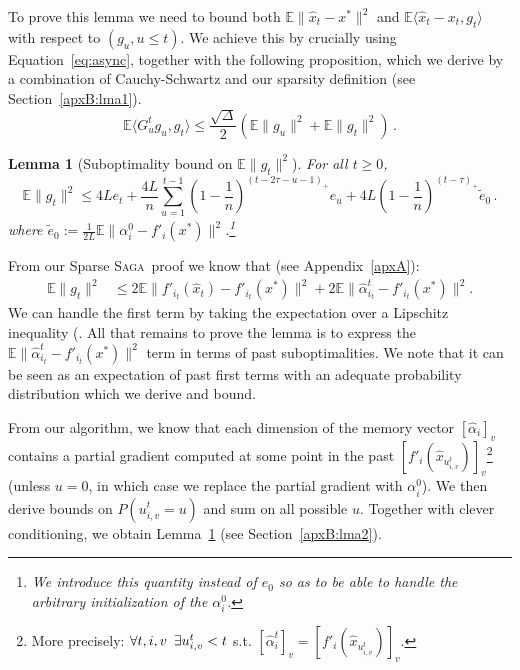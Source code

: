 \documentclass[twoside]{article}
\newcommand{\overlap}{\tau}
\newcommand{\sparsity}{\Delta}
\newcommand{\lipschitz}{L}
\newcommand{\E}{\mathbb{E}}
\newcommand{\SAGA}{\textsc{Saga}}
\newtheorem{lemma}{Lemma}
\begin{document}
To prove this lemma we need to bound both $\E\|\hat x_t - x^*\|^2$ and $\E\langle \hat x_t -x_t,  g_t\rangle$ with respect to $(g_u, u\leq t)$. 
We achieve this by crucially using Equation~\eqref{eq:async}, together with the following proposition, which we derive by a combination of Cauchy-Schwartz and our sparsity definition (see Section~\ref{apxB:lma1}).
\begin{equation}
\E \langle G_{u}^t g_{u}, g_t \rangle \leq \frac{\sqrt{\sparsity}}{2}(\E\|g_{u}\|^2 + \E\|g_{t}\|^2)  \, .
\end{equation}

\begin{lemma} [Suboptimality bound on $\E \|g_t\|^2$]\label{lma:suboptgt}
For all $t \geq 0$,
\begin{equation}\label{gtbound}
\E\|g_t\|^2 
\leq 4\lipschitz e_t 
	+ \frac{4\lipschitz}{n} \sum_{u=1}^{t-1} (1 - \frac{1}{n})^{(t-2\overlap-u -1)_+} e_u
	+ 4\lipschitz (1 - \frac{1}{n})^{(t-\overlap)_+} \tilde e_0  \, .
\end{equation}
where $\tilde e_0 := \frac{1}{2\lipschitz} \E\|\alpha_i^0 - f'_i(x^*)\|^2$.\footnote{We introduce this quantity instead of $e_0$ so as to be able to handle the arbitrary initialization of the $\alpha_i^0$.}
\end{lemma}

From our Sparse \SAGA\ proof we know that (see Appendix~\ref{apxA}):
\begin{align}
\E\|g_t\|^2 
&\leq 2 \E \|f'_{i_t}(\hat x_t)-f'_{i_t}(x^*)\|^2
	+ 2 \E \|\hat \alpha_{i_t}^t - f'_{i_t}(x^*)\|^2 .
\end{align}
We can handle the first term by taking the expectation over a Lipschitz inequality (\citet[Equations (7) and (8)]{qsaga}. 
All that remains to prove the lemma is to express the $\E \|\hat \alpha_{i_t}^t - f'_{i_t}(x^*)\|^2$ term in terms of past suboptimalities.
We note that it can be seen as an expectation of past first terms with an adequate probability distribution which we derive and bound.

From our algorithm, we know that each dimension of the memory vector $[\hat \alpha_i]_v$ contains a partial gradient computed at some point in the past $[f'_i(\hat x_{u_{i, v}^{t}})]_v$\footnote{More precisely: $\forall t, i, v \hspace{0.5em}\exists u_{i, v}^t<t$ s.t. $[\hat \alpha_{i}^t]_v = [f'_{i}(\hat x_{u_{i, v}^{t}})]_v$.} (unless $u=0$, in which case we replace the partial gradient with $\alpha_i^0$).
We then derive bounds on $P(u_{i,v}^t = u)$ and sum on all possible $u$. 
Together with clever conditioning, we obtain Lemma~\ref{lma:suboptgt} (see Section~\ref{apxB:lma2}).
\end{document}
